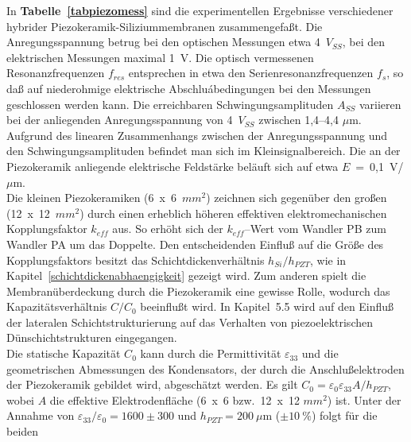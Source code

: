 In {\bf Tabelle~\ref{tabpiezomess}} sind die experimentellen Ergebnisse
verschiedener hybrider Piezokeramik-Siliziummembranen zusammengefaßt.
Die Anregungsspannung betrug bei den optischen Messungen etwa 4~$V_{SS}$,
bei den elektrischen Messungen maximal 1~V.
Die optisch vermessenen Resonanzfrequenzen $f_{res}$ entsprechen in
etwa den Serienresonanzfrequenzen $f_{s}$, so daß auf niederohmige
elektrische Abschluábedingungen bei den Messungen geschlossen werden kann.
Die erreichbaren Schwingungsamplituden $A_{SS}$ variieren bei der
anliegenden Anregungsspannung von 4~$V_{SS}$ zwischen 1,4--4,4 $\mu$m.
Aufgrund des linearen Zusammenhangs zwischen der Anregungsspannung und den
Schwingungsamplituden befindet man sich im Kleinsignalbereich. Die an der
Piezokeramik anliegende elektrische Feldstärke beläuft sich auf etwa
$E$~=~0,1~V/$\mu$m.\\
Die kleinen Piezokeramiken (6~x~6~$mm^{2}$) zeichnen sich gegenüber den
großen (12~x~12~$mm^{2}$) durch einen erheblich höheren effektiven
elektromechanischen Kopplungsfaktor $k_{eff}$ aus. So erhöht sich der
$k_{eff}$--Wert vom Wandler PB zum Wandler PA um das Doppelte. Den
entscheidenden Einfluß auf die Größe des Kopplungsfaktors besitzt das
Schichtdickenverhältnis $h_{Si}/h_{PZT}$, wie in
Kapitel~\ref{schichtdickenabhaengigkeit} gezeigt wird. Zum anderen spielt
die Membranüberdeckung durch die Piezokeramik eine gewisse Rolle, wodurch
das Kapazitätsverhältnis $C/C_{0}$ beeinflußt wird.
In Kapitel~5.5 wird auf den Einfluß der lateralen Schichtstrukturierung
auf das Verhalten von piezoelektrischen Dünschichtstrukturen
eingegangen.\\
Die statische Kapazität $C_{0}$ kann durch
die Permittivität $\varepsilon_{33}$ und die geometrischen Abmessungen
des Kondensators, der durch die Anschlußelektroden der Piezokeramik
gebildet wird, abgeschätzt werden. Es gilt
$C_{0}= \varepsilon_{0} \varepsilon_{33} A / h_{PZT}$, wobei
$A$ die effektive Elektrodenfläche (6~x~6 bzw.\ 12~x~12 $mm^{2}$) ist.
Unter der Annahme von $\varepsilon_{33} / \varepsilon_{0} = 1600\pm300$
und $h_{PZT} = 200~\mu$m ($\pm10~\%$) folgt für die beiden
